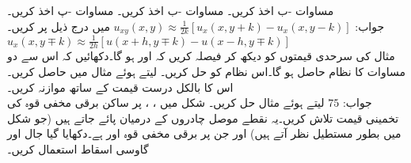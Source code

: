 \quad
مساوات -ب اخذ کریں۔
\quad
مساوات -ب اخذ کریں۔
\quad
مساوات -پ اخذ کریں۔\\
جواب:\quad
$u_{xy}(x,y)\approx \tfrac{1}{2k}[u_x(x,y+k)-u_x(x,y-k)]$
میں درج ذیل پر کریں۔\\
$u_x(x,y\mp k)\approx \tfrac{1}{2h}[u(x+h,y\mp k)-u(x-h,y\mp k)]$
\quad {}\\
مثال  کی سرحدی قیمتوں کو دیکھ کر فیصلہ کریں کہ  اور  ہو گا۔دکھائیں کہ اس سے دو مساوات کا نظام حاصل ہو گا۔اس نظام کو حل کریں۔
\quad
{} لیتے ہوئے مثال  میں  حاصل کریں۔اس کا بالکل درست قیمت  کے ساتھ موازنہ کریں۔\\
جواب:\quad
$75$
\quad
{} لیتے ہوئے مثال  حل کریں۔
\quad
شکل  میں ، ،  پر ساکن برقی مخفی قوہ کی تخمینی قیمت تلاش کریں۔یہ نقطے موصل چادروں کے درمیان پائے جاتے ہیں (جو شکل میں بطور مستطیل نظر آتے ہیں) اور جن پر برقی مخفی قوہ  اور  ہے۔دکھایا گیا جال اور گاوسی اسقاط استعمال کریں۔
